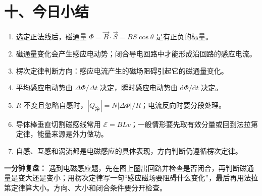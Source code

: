 \section*{十、今日小结}

\begin{enumerate}
  \item 选定正法线后，磁通量 $\Phi=\vec B\cdot\vec S=BS\cos\theta$ 是有正负的标量。
  \item 磁通量变化会产生感应电动势；闭合导电回路中才能形成沿回路的感应电流。
  \item 楞次定律判断方向：感应电流产生的磁场阻碍引起它的磁通量变化。
  \item 平均感应电动势由 $\Delta\Phi/\Delta t$ 决定，瞬时感应电动势由 $\mathrm d\Phi/\mathrm dt$ 决定。
  \item $R$ 不变且忽略自感时，$|Q_{\text{净}}|=N|\Delta\Phi|/R$；电流反向时要分段处理。
  \item 导体棒垂直切割磁感线常用 $\mathcal E=BLv$；一般情形要先取有效分量或回到法拉第定律，能量来源是外力做功。
  \item 自感、互感和涡流都是电磁感应的具体表现，方向判断仍遵循楞次定律。
\end{enumerate}

\textbf{一分钟复盘：} 遇到电磁感应题，先在图上圈出回路并检查是否闭合，再判断磁通量是变大还是变小；用楞次定律写一句“感应磁场要阻碍什么变化”，最后再用法拉第定律算大小。方向、大小和闭合条件要分开检查。
